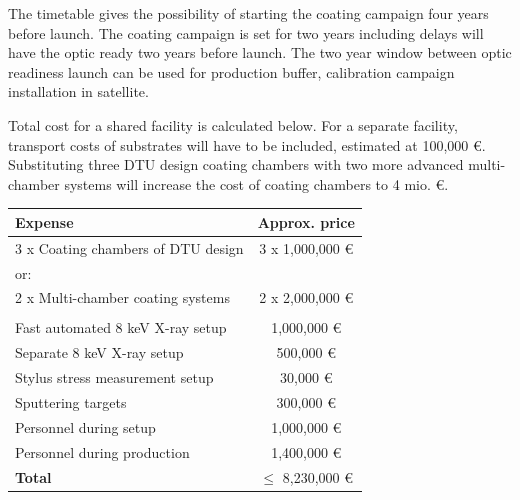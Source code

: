 The timetable gives the possibility of starting the coating campaign four years before launch. The coating campaign is set for two years including delays will have the optic ready two years before launch. The two year window between optic readiness launch can be used for production buffer, calibration campaign installation in satellite.

Total cost for a shared facility is calculated below. For a separate facility, transport costs of substrates will have to be included, estimated at 100,000 \euro. Substituting three DTU design coating chambers with two more advanced multi-chamber systems will increase the cost of coating chambers to 4 mio. \euro.

\begin{table}[htbp]
	\centering
\begin{tabular}{l|c}
Expense & Approx. price\\
\hline
\hline
3 x Coating chambers of DTU design  & 3 x 1,000,000 \euro\\
\hline
or:\\
\hline
2 x Multi-chamber coating systems & 2 x 2,000,000 \euro \\
\hline
\\
\hline
Fast automated 8 keV X-ray setup  & 1,000,000 \euro\\
\hline
Separate 8 keV X-ray setup & 500,000 \euro\\
\hline
Stylus stress measurement setup & 30,000 \euro\\
\hline
Sputtering targets & 300,000 \euro\\
\hline
Personnel during setup & 1,000,000 \euro\\
\hline
Personnel during production & 1,400,000 \euro\\
\hline
\textbf{Total} & $\leq$ 8,230,000 \euro\\
\end{tabular}
\end{table}
